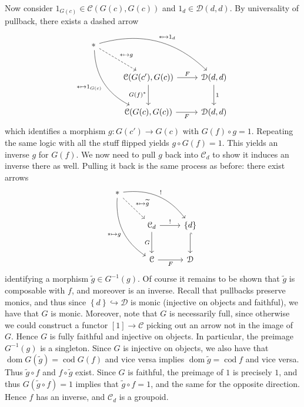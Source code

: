 Now consider $1_{G(c)} \in \mathcal{C} (G(c),G(c))$ and $1_d\in \mathcal{D} (d,d)$. By universality of pullback, there exists a dashed arrow
\[\begin{tikzcd}[row sep = 2.5em, column sep = 2.5em]
* \ar[" *\mapsto 1_d ", bend left, drr] \ar[" *\mapsto 1_{G(c)}  "', bend right, ddr] \ar[dashed, " *\mapsto g ", dr]  &  &  \\
 & \mathcal{C} (G(c'),G(c))\ar[" F ", r] \ar[" G(f)^* "', d]  & \mathcal{D} (d,d)\ar[" 1 ", d]  \\
 & \mathcal{C} (G(c),G(c))\ar[" F "', r]  & \mathcal{D} (d,d)
\end{tikzcd}\]
which identifies a morphism $g : G(c') \to G(c)$ with $G(f)\circ g=1$. Repeating the same logic with all the stuff flipped yields $g\circ G(f)=1$. This yields an inverse $g$ for $G(f)$. We now need to pull $g$ back into $\mathcal{C} _d$ to show it induces an inverse there as well. Pulling it back is the same process as before: there exist arrows
\[\begin{tikzcd}[row sep = 2.5em, column sep = 2.5em]
* \ar[" ! ", bend left, drr] \ar[" *\mapsto g "', bend right, ddr] \ar[dashed, " *\mapsto \widetilde{g}  ", dr]  &  &  \\
 & \mathcal{C} _d \ar[" ! ", r] \ar[" G "', d]  & \left\{ d \right\} \ar[hook, d]  \\
 & \mathcal{C} \ar[" F "', r]  & \mathcal{D} 
\end{tikzcd}\]
identifying a morphism $\widetilde{g} \in G^{-1} (g)$. Of course it remains to be shown that $\widetilde{g} $ is composable with $f$, and moreover is an inverse. Recall that pullbacks preserve monics, and thus since $\left\{ d \right\} \hookrightarrow \mathcal{D} $ is monic (injective on objects and faithful), we have that $G$ is monic. Moreover, note that $G$ is necessarily full, since otherwise we could construct a functor $[1]\to \mathcal{C} $ picking out an arrow not in the image of $G$. Hence $G$ is fully faithful and injective on objects. In particular, the preimage $G^{-1} (g)$ is a singleton. Since $G$ is injective on objects, we also have that $\operatorname{dom}  G(\widetilde{g} ) = \operatorname{cod} G(f)$ and vice versa implies $\operatorname{dom}  \widetilde{g} =\operatorname{cod} f$ and vice versa. Thus $\widetilde{g} \circ f$ and $f\circ \widetilde{g} $ exist. Since $G$ is faithful, the preimage of $1$ is precisely $1$, and thus $G(\widetilde{g} \circ f)=1$ implies that $\widetilde{g} \circ f=1$, and the same for the opposite direction. Hence $f$ has an inverse, and $\mathcal{C} _d$ is a groupoid.


